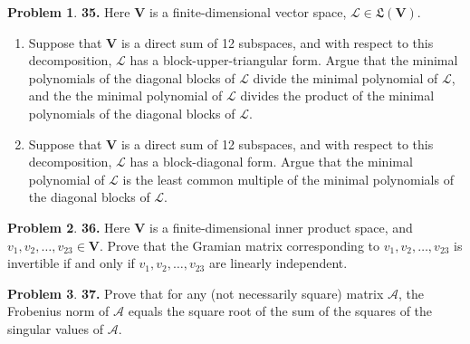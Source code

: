 \documentclass{book}
\theoremstyle{definition}
\newtheorem*{prob*}{Problem}
\newcommand{\V}{\mathbf{V}}
\newcommand{\A}{\mathcal{A}}
\newcommand{\lag}{\mathcal{L}}
\newcommand{\LL}{\mathfrak{L}}
\begin{document}
\newpage










\begin{prob*}\textbf{35.} Here $\V$ is a finite-dimensional vector space, $\lag \in \LL(\V)$. 
	
	\begin{enumerate}
		\item Suppose that $\V$ is a direct sum of 12 subspaces, and with respect to this decomposition, $\lag$ has a block-upper-triangular form. Argue that the minimal polynomials of the diagonal blocks of $\lag$ divide the minimal polynomial of $\lag$, and the the minimal polynomial of $\lag$ divides the product of the minimal polynomials of the diagonal blocks of $\lag$.
		
		\item Suppose that $\V$ is a direct sum of 12 subspaces, and with respect to this decomposition, $\lag$ has a block-diagonal form. Argue that the minimal polynomial of $\lag$ is the least common multiple of the minimal polynomials of the diagonal blocks of $\lag$. 
	\end{enumerate}
	
\end{prob*}




\newpage





\begin{prob*}\textbf{36.} Here $\V$ is a finite-dimensional inner product space, and $v_1, v_2, \dots, v_23 \in \V$. Prove that the Gramian matrix corresponding to $v_1, v_2, \dots ,v_{23}$ is invertible if and only if $v_1, v_2, \dots, v_{23}$ are linearly independent. 
	
\end{prob*}




\newpage





\begin{prob*}\textbf{37.} Prove that for any (not necessarily square) matrix $\A$, the Frobenius norm of $\A$ equals the square root of the sum of the squares of the singular values of $\A$.
	
\end{prob*}
\end{document}
